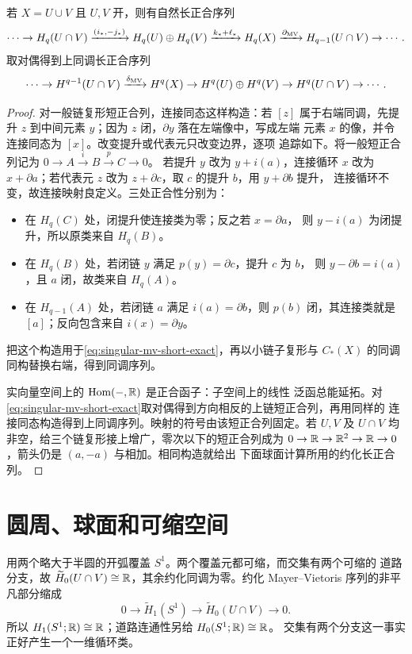 \begin{theorem}\label{thm:mayer-vietoris-singular}
若 $X=U\cup V$ 且 $U,V$ 开，则有自然长正合序列
\[
 \cdots\to H_q(U\cap V)\xrightarrow{(i_*,-j_*)}
 H_q(U)\oplus H_q(V)\xrightarrow{k_*+\ell_*}H_q(X)
 \xrightarrow{\partial_{\rm MV}}H_{q-1}(U\cap V)\to\cdots .
\]
取对偶得到上同调长正合序列
\[
 \cdots\to H^{q-1}(U\cap V)\xrightarrow{\delta_{\rm MV}}H^q(X)
 \to H^q(U)\oplus H^q(V)\to H^q(U\cap V)\to\cdots .
\]
\end{theorem}
\begin{proof}
对一般链复形短正合列，连接同态这样构造：若 $[z]$ 属于右端同调，先提升
$z$ 到中间元素 $y$；因为 $z$ 闭，$\partial y$ 落在左端像中，写成左端
元素 $x$ 的像，并令连接同态为 $[x]$。改变提升或代表元只改变边界，逐项
追踪如下。将一般短正合列记为 $0\to A\xrightarrow{i}B\xrightarrow{p}C\to0$。
若提升 $y$ 改为 $y+i(a)$，连接循环 $x$ 改为 $x+\partial a$；若代表元
$z$ 改为 $z+\partial c$，取 $c$ 的提升 $b$，用 $y+\partial b$ 提升，
连接循环不变，故连接映射良定义。三处正合性分别为：
\begin{itemize}
\item 在 $H_q(C)$ 处，闭提升使连接类为零；反之若 $x=\partial a$，
则 $y-i(a)$ 为闭提升，所以原类来自 $H_q(B)$。
\item 在 $H_q(B)$ 处，若闭链 $y$ 满足 $p(y)=\partial c$，提升 $c$ 为 $b$，
则 $y-\partial b=i(a)$，且 $a$ 闭，故类来自 $H_q(A)$。
\item 在 $H_{q-1}(A)$ 处，若闭链 $a$ 满足 $i(a)=\partial b$，则 $p(b)$
闭，其连接类就是 $[a]$；反向包含来自 $i(x)=\partial y$。
\end{itemize}
把这个构造用于\eqref{eq:singular-mv-short-exact}，再以小链子复形与
$C_*(X)$ 的同调同构替换右端，得到同调序列。

实向量空间上的 $\operatorname{Hom}(-,\mathbb{R})$ 是正合函子：子空间上的线性
泛函总能延拓。对\eqref{eq:singular-mv-short-exact}取对偶得到方向相反的上链短正合列，再用同样的
连接同态构造得到上同调序列。映射的符号由该短正合列固定。若 $U,V$ 及
$U\cap V$ 均非空，给三个链复形接上增广，零次以下的短正合列成为
$0\to\mathbb{R}\to\mathbb{R}^2\to\mathbb{R}\to0$，箭头仍是 $(a,-a)$ 与相加。相同构造就给出
下面球面计算所用的约化长正合列。
\end{proof}

\section{圆周、球面和可缩空间}

\begin{example}[圆周的第一次计算]
用两个略大于半圆的开弧覆盖 $S^1$。两个覆盖元都可缩，而交集有两个可缩的
道路分支，故
$\widetilde H_0(U\cap V)\cong\mathbb{R}$，其余约化同调为零。约化
Mayer--Vietoris 序列的非平凡部分缩成
\[
 0\longrightarrow\widetilde H_1(S^1)\longrightarrow
 \widetilde H_0(U\cap V)\longrightarrow0.
\]
所以 $H_1(S^1;\mathbb{R})\cong\mathbb{R}$；道路连通性另给 $H_0(S^1;\mathbb{R})\cong\mathbb{R}$。
交集有两个分支这一事实正好产生一个一维循环类。
\end{example}

